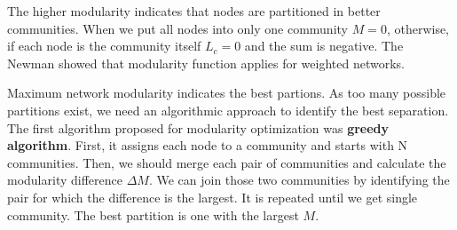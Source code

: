 




The higher modularity indicates that nodes are partitioned in better communities. When we put all nodes into only one community $M=0$, otherwise, if each node is the community itself $L_c=0$ and the sum is negative. The Newman showed that modularity function  \cite{newman2004analysis} applies for weighted networks.

Maximum network modularity indicates the best partions. As too many possible partitions exist, we need an algorithmic approach to identify the best separation. The first algorithm proposed for modularity optimization was \textbf{greedy algorithm}. First, it assigns each node to a community and starts with N communities. Then, we should merge each pair of communities and calculate the modularity difference $\Delta M$. We can join those two communities by identifying the pair for which the difference is the largest. It is repeated until we get single community. The best partition is one with the largest $M$.

